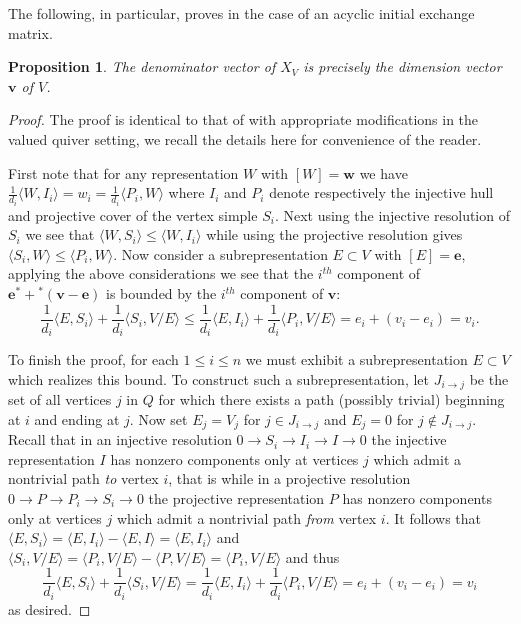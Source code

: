 \documentclass{amsart}
\newtheorem{proposition}[theorem]{Proposition}
\newcommand{\bfe}{\mathbf{e}}
\newcommand{\bfv}{\mathbf{v}}
\newcommand{\bfw}{\mathbf{w}}
\begin{document}
  The following, in particular, proves \cite[Conj. 1.9]{reading-stella} in the case of an acyclic initial exchange matrix.
  \begin{proposition}
    The denominator vector of $X_V$ is precisely the dimension vector $\bfv$ of $V$.
  \end{proposition}
  \begin{proof}
    The proof is identical to that of \cite[Sec. 4, Cor. 2]{caldero-keller} with appropriate modifications in the valued quiver setting, we recall the details here for convenience of the reader.  

    First note that for any representation $W$ with $[W]=\bfw$ we have $\frac{1}{d_i}\langle W,I_i\rangle=w_i=\frac{1}{d_i}\langle P_i,W\rangle$ where $I_i$ and $P_i$ denote respectively the injective hull and projective cover of the vertex simple $S_i$.  Next using the injective resolution of $S_i$ we see that $\langle W,S_i\rangle\le\langle W,I_i\rangle$ while using the projective resolution gives $\langle S_i,W\rangle\le\langle P_i,W\rangle$.  Now consider a subrepresentation $E\subset V$ with $[E]=\bfe$, applying the above considerations we see that the $i^{th}$ component of $\bfe^*+{}^*(\bfv-\bfe)$ is bounded by the $i^{th}$ component of $\bfv$:
    \[\frac{1}{d_i}\langle E,S_i\rangle+\frac{1}{d_i}\langle S_i,V/E\rangle\le\frac{1}{d_i}\langle E,I_i\rangle+\frac{1}{d_i}\langle P_i,V/E\rangle=e_i+(v_i-e_i)=v_i.\]

    To finish the proof, for each $1\le i\le n$ we must exhibit a subrepresentation $E\subset V$ which realizes this bound.  To construct such a subrepresentation, let $J_{i\to j}$ be the set of all vertices $j$ in $Q$ for which there exists a path (possibly trivial) beginning at $i$ and ending at $j$.  Now set $E_j=V_j$ for $j\in J_{i\to j}$ and $E_j=0$ for $j\notin J_{i\to j}$.  Recall that in an injective resolution $0\longrightarrow S_i\longrightarrow I_i\longrightarrow I\longrightarrow 0$ the injective representation $I$ has nonzero components only at vertices $j$ which admit a nontrivial path \emph{to} vertex $i$, that is while in a projective resolution $0\longrightarrow P\longrightarrow P_i\longrightarrow S_i\longrightarrow 0$ the projective representation $P$ has nonzero components only at vertices $j$ which admit a nontrivial path \emph{from} vertex $i$.  It follows that $\langle E,S_i\rangle=\langle E,I_i\rangle-\langle E,I\rangle=\langle E,I_i\rangle$ and $\langle S_i,V/E\rangle=\langle P_i,V/E\rangle-\langle P,V/E\rangle=\langle P_i,V/E\rangle$ and thus 
    \[\frac{1}{d_i}\langle E,S_i\rangle+\frac{1}{d_i}\langle S_i,V/E\rangle=\frac{1}{d_i}\langle E,I_i\rangle+\frac{1}{d_i}\langle P_i,V/E\rangle=e_i+(v_i-e_i)=v_i\]
    as desired.
  \end{proof}
\end{document}
